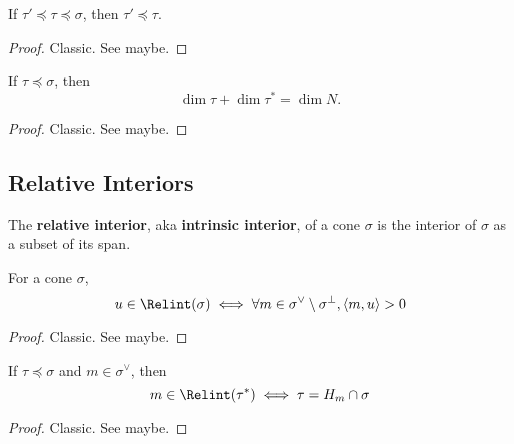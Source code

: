 \begin{proposition}
  \label{1-2-10-dual-face-antitone}

  If $\tau' \preceq \tau \preceq \sigma$, then $\tau' \preceq \tau$.
\end{proposition}
\begin{proof}
  \uses{}

  Classic. See \cite{Oda_1988} maybe.
\end{proof}


\begin{proposition}
  \label{1-2-10-dim-dual-face}

  If $\tau \preceq \sigma$, then
  $$\dim \tau + \dim \tau^* = \dim N.$$
\end{proposition}
\begin{proof}
  \uses{}

  Classic. See \cite{Oda_1988} maybe.
\end{proof}


\subsection{Relative Interiors}


\begin{definition}
  \label{1-2-rel-interior}
  \uses{}
  \leanok

  The {\bf relative interior}, aka {\bf intrinsic interior}, of a cone $\sigma$ is the interior of $\sigma$ as a subset of its span.
\end{definition}


\begin{lemma}
  \label{1-2-rel-interior-inner}

  For a cone $\sigma$,
  $$u \in \Relint(\sigma) \iff \forall m \in \sigma^\vee \setminus \sigma^\perp, \langle m, u\rangle > 0$$
\end{lemma}
\begin{proof}
  \uses{}

  Classic. See \cite{Oda_1988} maybe.
\end{proof}


\begin{lemma}
  \label{1-2-rel-interior-dual-face}

  If $\tau \preceq \sigma$ and $m \in \sigma^\vee$, then
  $$m \in \Relint(\tau^*) \iff \tau = H_m \cap \sigma$$
\end{lemma}
\begin{proof}
  \uses{}

  Classic. See \cite{Oda_1988} maybe.
\end{proof}


